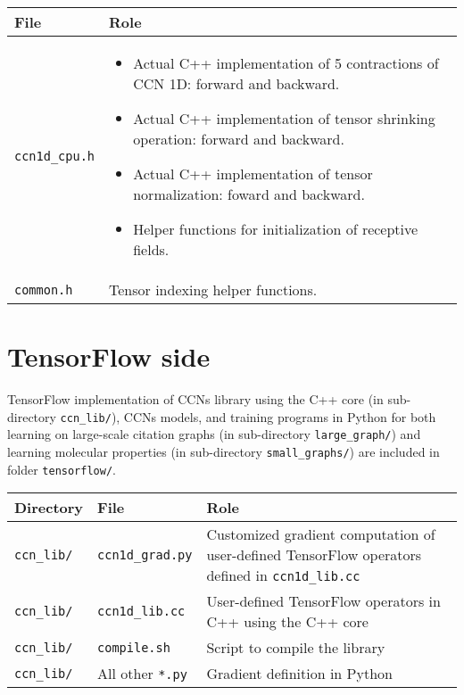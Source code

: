 \documentclass[12pt]{article}
\begin{document}
\begin{center}
\begin{tabular}{| p{} | p{} |}
\hline
\textbf{File} & \textbf{Role} \\
\hline
\texttt{ccn1d\_cpu.h} & 
\begin{itemize}
\item Actual C++ implementation of 5 contractions of CCN 1D: forward and backward.
\item Actual C++ implementation of tensor shrinking operation: forward and backward.
\item Actual C++ implementation of tensor normalization: foward and backward.
\item Helper functions for initialization of receptive fields.
\end{itemize} \\
\hline
\texttt{common.h} & Tensor indexing helper functions. \\
\hline
\end{tabular}
\end{center}

\clearpage

\section{TensorFlow side}

TensorFlow implementation of CCNs library using the C++ core (in sub-directory \texttt{ccn\_lib/}), CCNs models, and training programs in Python for both learning on large-scale citation graphs (in sub-directory \texttt{large\_graph/}) and learning molecular properties (in sub-directory \texttt{small\_graphs/}) are included in folder \texttt{tensorflow/}.

\begin{center}
\begin{tabular}{| p{} | p{} | p{} |}
\hline
\textbf{Directory} & \textbf{File} & \textbf{Role} \\
\hline
\texttt{ccn\_lib/}
&
\texttt{ccn1d\_grad.py}
& 
Customized gradient computation of user-defined TensorFlow operators defined in \texttt{ccn1d\_lib.cc}
\\
\hline
\texttt{ccn\_lib/}
&
\texttt{ccn1d\_lib.cc}
& 
User-defined TensorFlow operators in C++ using the C++ core
\\
\hline
\texttt{ccn\_lib/}
&
\texttt{compile.sh}
& 
Script to compile the library
\\
\hline
\texttt{ccn\_lib/}
&
All other \texttt{*.py}
& 
Gradient definition in Python
\\
\hline
\end{tabular}
\end{center}
\end{document}
